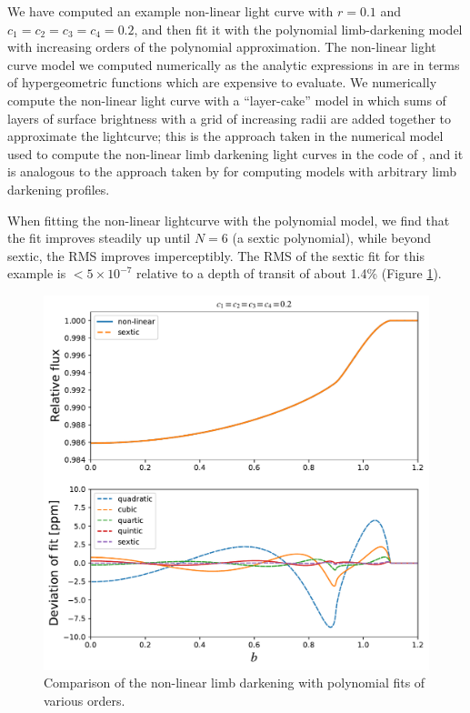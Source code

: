 \documentclass[modern,trackchanges]{aastex63}
\begin{document}

We have computed an example non-linear light curve with $r=0.1$ and
$c_1=c_2=c_3=c_4=0.2$, and then fit it with the polynomial limb-darkening
model with increasing orders of the polynomial approximation.  The non-linear light curve model
we computed numerically as the analytic expressions in \citet{MandelAgol2002}
are in terms of hypergeometric functions which are expensive to evaluate.
We numerically compute the non-linear light curve with a ``layer-cake'' model in which sums of
layers of surface brightness with a grid of increasing radii are added together
to approximate the lightcurve;  this
is the approach taken in the numerical model used to compute the
non-linear limb darkening light curves in the code of \citet{MandelAgol2002},
and it is analogous to the approach taken by \citet{Kreidberg2015} for
computing models with arbitrary limb darkening profiles.

When fitting the non-linear lightcurve with the polynomial model,
we find that the fit improves steadily up until $N=6$ (a sextic
polynomial), while beyond sextic, the RMS improves imperceptibly.
The RMS of the sextic fit for this example is $<5 \times 10^{-7}$
relative to a depth of transit of about 1.4\% (Figure \ref{fig:nonlinear}).

\begin{figure}
    \begin{centering}
    \includegraphics[width=0.8\linewidth]{figures/julia/occult_nonlinear_poly.pdf}
    \caption{Comparison of the non-linear limb darkening with polynomial
    fits of various orders.
    \label{fig:nonlinear}}
    \end{centering}
\end{figure}
\end{document}
